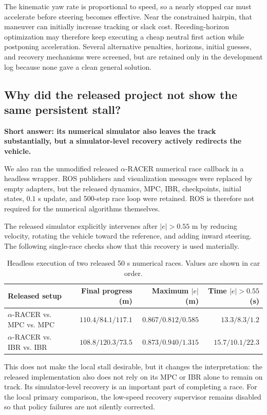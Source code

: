 \documentclass[11pt]{article}
\begin{document}
The kinematic yaw rate is proportional to speed, so a nearly stopped car must
accelerate before steering becomes effective. Near the constrained hairpin,
that maneuver can initially increase tracking or slack cost. Receding-horizon
optimization may therefore keep executing a cheap neutral first action while
postponing acceleration. Several alternative penalties, horizons, initial
guesses, and recovery mechanisms were screened, but are retained only in the
development log because none gave a clean general solution.

\subsection{Why did the released project not show the same persistent stall?}

\noindent\textbf{Short answer: its numerical simulator also leaves the track
substantially, but a simulator-level recovery actively redirects the vehicle.}

We also ran the unmodified released $\alpha$-RACER numerical race callback in a
headless wrapper. ROS publishers and visualization messages were replaced by
empty adapters, but the released dynamics, MPC, IBR, checkpoints, initial
states, $0.1$ s update, and 500-step race loop were retained. ROS is therefore
not required for the numerical algorithms themselves.

The released simulator explicitly intervenes after $|e|>0.55$ m by reducing
velocity, rotating the vehicle toward the reference, and adding inward steering.
The following single-race checks show that this recovery is used materially.

\begin{table}[ht]
  \centering
  \small
  \begin{tabular}{lrrr}
    \toprule
    Released setup & Final progress (m) & Maximum $|e|$ (m) & Time $|e|>0.55$ (s) \\
    \midrule
    $\alpha$-RACER vs. MPC vs. MPC
      & $110.4/84.1/117.1$ & $0.867/0.812/0.585$ & $13.3/8.3/1.2$ \\
    $\alpha$-RACER vs. IBR vs. IBR
      & $108.8/120.3/73.5$ & $0.873/0.940/1.315$ & $15.7/10.1/22.3$ \\
    \bottomrule
  \end{tabular}
  \caption{Headless execution of two released 50 s numerical races. Values are
  shown in car order.}
\end{table}

This does not make the local stall desirable, but it changes the interpretation:
the released implementation also does not rely on its MPC or IBR alone to remain
on track. Its simulator-level recovery is an important part of completing a
race. For the local primary comparison, the low-speed recovery supervisor remains
disabled so that policy failures are not silently corrected.
\end{document}
